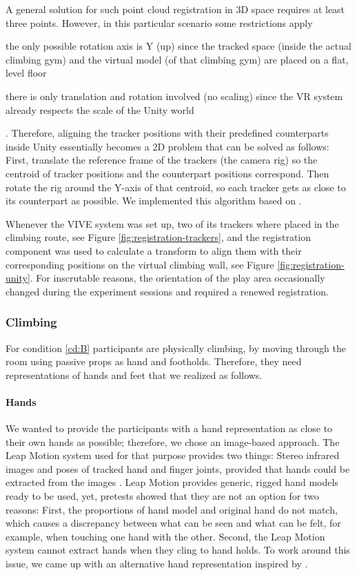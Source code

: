 A general solution for such point cloud registration in 3D space requires at least three points. However, in this particular scenario some restrictions apply \begin{inlinelist}
\item{the only possible rotation axis is Y (up) since the tracked space (inside the actual climbing gym) and the virtual model (of that climbing gym) are placed on a flat, level floor}
\item{there is only translation and rotation involved (no scaling) since the \gls{VR} system already respects the scale of the Unity world}
\end{inlinelist}. Therefore, aligning the tracker positions with their predefined counterparts inside Unity essentially becomes a 2D problem that can be solved as follows: First, translate the reference frame of the trackers (the camera rig) so the centroid of tracker positions and the counterpart positions correspond. Then rotate the rig around the Y-axis of that centroid, so each tracker gets as close to its counterpart as possible. We implemented this algorithm based on \textcite{Ho2013}.



Whenever the VIVE system was set up, two of its trackers where placed in the climbing route, see Figure \ref{fig:registration-trackers}, and the registration component was used to calculate a transform to align them with their corresponding positions on the virtual climbing wall, see Figure \ref{fig:registration-unity}. For inscrutable reasons, the orientation of the play area occasionally changed during the experiment sessions and required a renewed registration.

\subsubsection*{Climbing}

For condition \ref{cd:B} participants are physically climbing, by moving through the room using passive props as hand and footholds. Therefore, they need representations of hands and feet that we realized as follows.

\paragraph{Hands} We wanted to provide the participants with a hand representation as close to their own hands as possible; therefore, we chose an image-based approach. The Leap Motion system used for that purpose provides two things: Stereo infrared images and poses of tracked hand and finger joints, provided that hands could be extracted from the images \autocite{Colgan2014}. Leap Motion provides generic, rigged hand models ready to be used, yet, pretests showed that they are not an option for two reasons: First, the proportions of hand model and original hand do not match, which causes a discrepancy between what can be seen and what can be felt, for example, when touching one hand with the other. Second, the Leap Motion system cannot extract hands when they cling to hand holds. To work around this issue, we came up with an alternative hand representation inspired by \textcite{Colgan2015}. 

